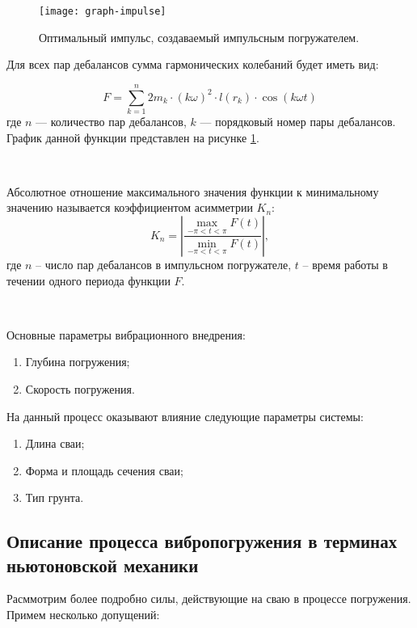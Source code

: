 \begin{figure}[ht]
    \centering
    \texttt{[image: graph-impulse]}
    \caption{Оптимальный импульс, создаваемый импульсным погружателем.}
    \label{fig:graph-impulse}
\end{figure}

\noindent Для всех пар дебалансов сумма гармонических колебаний будет иметь вид:

\begin{equation}
    \label{eq:F}
    F = \sum\limits_{k = 1}^n 2 m_k \cdot (k \omega)^2 \cdot l(r_k) \cdot \cos (k \omega t)
\end{equation}
\noindent где $n$ --- количество пар дебалансов, $k$ --- порядковый номер пары дебалансов. График данной функции
представлен на рисунке \ref{fig:graph-impulse}.

~\

Абсолютное отношение максимального значения функции к минимальному значению называется коэффициентом асимметрии $K_n$:
\begin{equation}
    \label{eq:asymm-coef}
    K_n = \left| \frac{ \max\limits_{-\pi<t<\pi} F(t)}{\min\limits_{-\pi<t<\pi} F(t)}\right|,
\end{equation}
где $n$ -- число пар дебалансов в импульсном погружателе, $t$ -- время работы в течении одного периода функции $F$.

~\

\noindent Основные параметры вибрационного внедрения:
\begin{enumerate}
    \item Глубина погружения;
    \item Скорость погружения.
\end{enumerate}
На данный процесс оказывают влияние следующие параметры системы:
\begin{enumerate}
    \item Длина сваи;
    \item Форма и площадь сечения сваи;
    \item Тип грунта.
\end{enumerate}

\subsection{Описание процесса вибропогружения в терминах ньютоновской механики}
\label{chapter:newton}

Расммотрим более подробно силы, действующие на сваю в процессе погружения. Примем несколько допущений:

